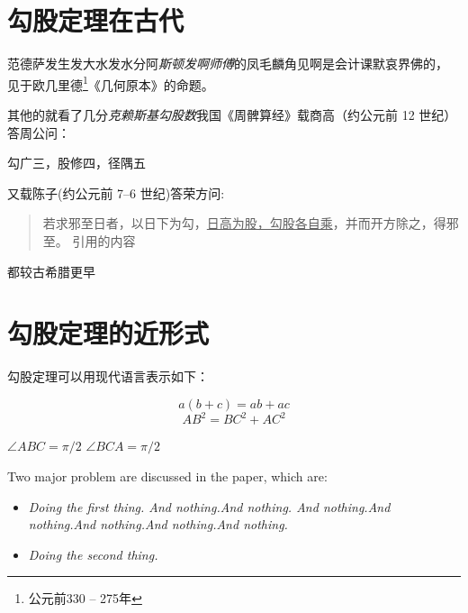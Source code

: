 \documentclass{template}
\newcommand\an{\angle}
\begin{document}
\ttfamily
\section{勾股定理在古代}
范德萨发生发大水发水分阿\textsl{斯顿发啊师傅}的凤毛麟角见啊是会计课默哀界佛的，
见于欧几里德\footnote{公元前330 -- 275年}《几何原本》的命题。

其他的就看了几分\emph{克赖斯基勾股数}我国《周髀算经》载商高（约公元前 12 世纪）答周公问：
\begin{myquote}
    勾广三，股修四，径隅五
\end{myquote}
又载陈子(约公元前 7--6 世纪)答荣方问:
\begin{quote}
    若求邪至日者，以日下为勾，\underline{日高为股，勾股各自乘}，并而开方除之，得邪至。
    \kaishu 引用的内容
\end{quote}
都较古希腊更早

\section{勾股定理的近形式}

勾股定理可以用现代语言表示如下：

\begin{equation}
    a(b + c) = ab + ac
\end{equation}
\begin{equation}
    AB^2 = BC^2 + AC^2
\end{equation}

$\angle ABC = \pi / 2$
$\an BCA = \pi / 2$


Two major problem are discussed in the paper, which are: 
\begin{itemize}[
    leftmargin=8mm, %
     itemindent=1cm, %
    ]
    \item \textit{Doing the first thing. And nothing.And nothing.
    And nothing.And nothing.And nothing.And nothing.And nothing.}
    \item \textsl{Doing the second thing.}
\end{itemize}
\end{document}
